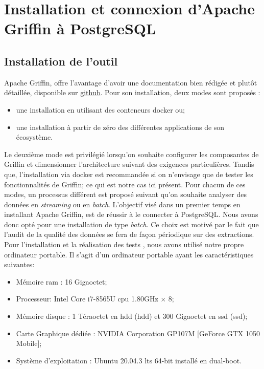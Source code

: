 \section{Installation et connexion d'Apache Griffin \`a PostgreSQL}
\subsection{Installation de l'outil}
Apache Griffin, offre l'avantage d'avoir une documentation bien r\'edig\'ee et plut\^ot d\'etaill\'ee, disponible sur \href{https://github.com/apache/griffin}{github}. Pour son installation, deux modes sont propos\'es : 
\begin{itemize}[parsep=0cm,itemsep=0cm]
\item une installation en utilisant des conteneurs docker ou;
\item une installation \`a partir de z\'ero  des diff\'erentes applications de son \'ecosyst\`eme.
\end{itemize}
Le deuxi\`eme mode est privil\'egi\'e lorsqu'on souhaite configurer les composantes de Griffin et dimensionner l'architecture suivant des exigences particuli\`eres. Tandis que, l'installation via docker est recommand\'ee si on n'envisage que de tester les fonctionnalit\'es de  Griffin; ce qui est notre cas ici pr\'esent. Pour chacun de ces modes, un processus diff\'erent est propos\'e  suivant qu'on souhaite analyser des donn\'ees en \textit{streaming} ou en \textit{batch}. L'objectif vis\'e dans un premier temps en installant Apache Griffin, est de r\'eussir \`a le connecter \`a PostgreSQL. Nous avons donc opt\'e pour une installation de type \textit{batch}. Ce choix est motiv\'e par le fait que l'audit de la qualit\'e des donn\'ees se fera de façon p\'eriodique sur des extractions.
\\

Pour l'installation et la r\'ealisation des tests , nous avons utilis\'e notre propre ordinateur portable. Il s'agit d'un ordinateur portable ayant les caract\'eristiques suivantes: 
\begin{itemize}[parsep=0cm,itemsep=0cm]
\item M\'emoire \acrshort{ram} : 16 Gigaoctet;
\item Processeur:  Intel Core i7-8565U \acrshort{cpu} \@ 1.80GHz × 8;
\item M\'emoire disque : 1 T\'eraoctet en \acrshort{hdd} (\acrlong{hdd}) et 300 Gigaoctet en \acrshort{ssd} (\acrlong{ssd});
\item Carte Graphique d\'edi\'ee : NVIDIA Corporation GP107M [GeForce GTX 1050 Mobile];
\item Syst\`eme d'exploitation : Ubuntu 20.04.3 \acrshort{lts} 64-bit install\'e en dual-boot.
\end{itemize}

